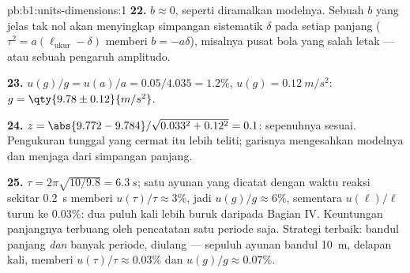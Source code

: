 \begin{solution}{pb:b1:units-dimensions:1}
\textbf{22.} $b \approx 0$, seperti diramalkan modelnya. Sebuah $b$ yang
jelas tak nol akan menyingkap simpangan sistematik $\delta$ pada setiap panjang
($\tau^2 = a(\ell_{\text{ukur}} - \delta)$ memberi $b = -a\delta$), misalnya
pusat bola yang salah letak --- atau sebuah pengaruh amplitudo.

\textbf{23.} $u(g)/g = u(a)/a = 0.05/4.035 = 1.2\%$, $u(g) =
\qty{0.12}{m/s^2}$: $g = \qty{9.78\pm0.12}{m/s^2}$.

\textbf{24.} $z = \abs{9.772 - 9.784}/\sqrt{0.033^2 + 0.12^2} = 0.1$:
sepenuhnya sesuai. Pengukuran tunggal yang cermat itu lebih teliti; garisnya
mengesahkan modelnya dan menjaga dari simpangan panjang.

\textbf{25.} $\tau = 2\pi\sqrt{10/9.8} = \qty{6.3}{s}$; satu ayunan yang
dicatat dengan waktu reaksi sekitar \qty{0.2}{s} memberi $u(\tau)/\tau \approx
3\%$, jadi $u(g)/g \approx 6\%$, sementara $u(\ell)/\ell$ turun ke
$0.03\%$: dua puluh kali lebih buruk daripada Bagian IV. Keuntungan panjangnya
terbuang oleh pencatatan satu periode saja. Strategi terbaik: bandul panjang
\emph{dan} banyak periode, diulang --- sepuluh ayunan bandul \qty{10}{m},
delapan kali, memberi $u(\tau)/\tau \approx 0.03\%$ dan $u(g)/g \approx 0.07\%$.
\end{solution}

